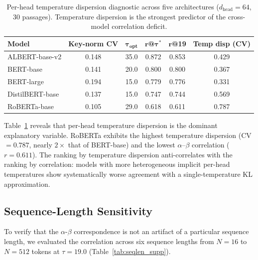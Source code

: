 \documentclass[twoside,11pt]{article}
\begin{document}
\begin{table}[h]
\centering
\renewcommand{\arraystretch}{1.15}
\begin{tabular}{lccccc}
\hline
\textbf{Model} & \textbf{Key-norm CV} & $\boldsymbol{\tau}_{\textbf{opt}}$ & $\boldsymbol{r}$\textbf{@}$\boldsymbol{\tau^*}$ & $\boldsymbol{r}$\textbf{@19} & \textbf{Temp disp (CV)} \\
\hline
ALBERT-base-v2 & 0.148 & 35.0 & 0.872 & 0.853 & 0.429 \\
BERT-base & 0.141 & 20.0 & 0.800 & 0.800 & 0.367 \\
BERT-large & 0.194 & 15.0 & 0.779 & 0.776 & 0.331 \\
DistilBERT-base & 0.137 & 15.0 & 0.747 & 0.744 & 0.569 \\
RoBERTa-base & 0.105 & 29.0 & 0.618 & 0.611 & 0.787 \\
\hline
\end{tabular}
\caption{Per-head temperature dispersion diagnostic across five architectures ($d_{\text{head}} = 64$, 30 passages). Temperature dispersion is the strongest predictor of the cross-model correlation deficit.}
\label{tab:temp_dispersion_supp}
\end{table}

Table~\ref{tab:temp_dispersion_supp} reveals that per-head temperature dispersion is the dominant explanatory variable. RoBERTa exhibits the highest temperature dispersion (CV $= 0.787$, nearly $2\times$ that of BERT-base) and the lowest $\alpha$--$\beta$ correlation ($r = 0.611$). The ranking by temperature dispersion anti-correlates with the ranking by correlation: models with more heterogeneous implicit per-head temperatures show systematically worse agreement with a single-temperature KL approximation.

\subsection{Sequence-Length Sensitivity}

To verify that the $\alpha$-$\beta$ correspondence is not an artifact of a particular sequence length, we evaluated the correlation across six sequence lengths from $N = 16$ to $N = 512$ tokens at $\tau = 19.0$ (Table~\ref{tab:seqlen_supp}).
\end{document}
